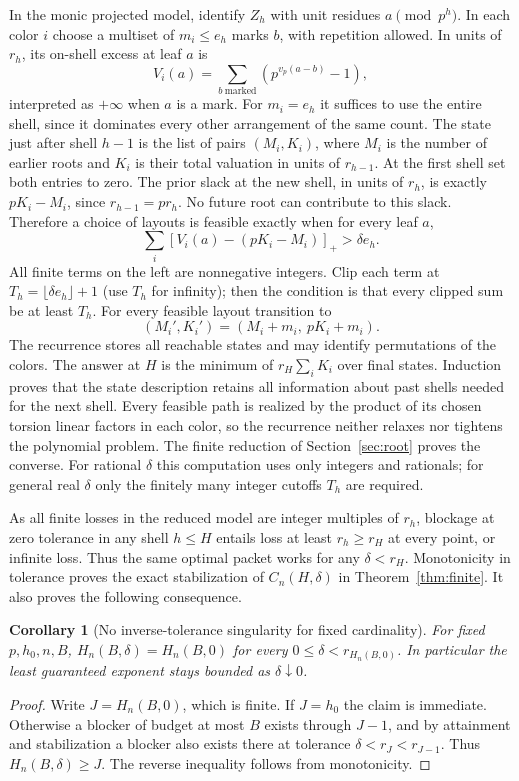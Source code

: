 \documentclass[11pt]{article}
\newtheorem{corollary}[theorem]{Corollary}
\theoremstyle{remark}\newtheorem{remark}[theorem]{Remark}
\newcommand{\pos}[1]{\left[#1\right]_+}
\begin{document}
In the monic projected model, identify $Z_h$ with unit residues $a\pmod{p^h}$. In each color $i$ choose a multiset of $m_i\le e_h$ marks $b$, with repetition allowed. In units of $r_h$, its on-shell excess at leaf $a$ is
\[
 V_i(a)=\sum_{b\ \mathrm{marked}}(p^{v_p(a-b)}-1),
\]
interpreted as $+\infty$ when $a$ is a mark. For $m_i=e_h$ it suffices to use the entire shell, since it dominates every other arrangement of the same count. The state just after shell $h-1$ is the list of pairs $(M_i,K_i)$, where $M_i$ is the number of earlier roots and $K_i$ is their total valuation in units of $r_{h-1}$. At the first shell set both entries to zero. The prior slack at the new shell, in units of $r_h$, is exactly $pK_i-M_i$, since $r_{h-1}=p r_h$. No future root can contribute to this slack. Therefore a choice of layouts is feasible exactly when for every leaf $a$,
\begin{equation}\label{eq:dpcondition}
 \sum_i\pos{V_i(a)-(pK_i-M_i)}>\delta e_h.
\end{equation}
All finite terms on the left are nonnegative integers. Clip each term at $T_h=\lfloor\delta e_h\rfloor+1$ (use $T_h$ for infinity); then the condition is that every clipped sum be at least $T_h$. For every feasible layout transition to
\[
 (M_i',K_i')=(M_i+m_i,\ pK_i+m_i).
\]
The recurrence stores all reachable states and may identify permutations of the colors. The answer at $H$ is the minimum of $r_H\sum_i K_i$ over final states. Induction proves that the state description retains all information about past shells needed for the next shell. Every feasible path is realized by the product of its chosen torsion linear factors in each color, so the recurrence neither relaxes nor tightens the polynomial problem. The finite reduction of Section~\ref{sec:root} proves the converse. For rational $\delta$ this computation uses only integers and rationals; for general real $\delta$ only the finitely many integer cutoffs $T_h$ are required.

As all finite losses in the reduced model are integer multiples of $r_h$, blockage at zero tolerance in any shell $h\le H$ entails loss at least $r_h\ge r_H$ at every point, or infinite loss. Thus the same optimal packet works for any $\delta<r_H$. Monotonicity in tolerance proves the exact stabilization of $C_n(H,\delta)$ in Theorem~\ref{thm:finite}. It also proves the following consequence.
\begin{corollary}[No inverse-tolerance singularity for fixed cardinality]
For fixed $p,h_0,n,B$, $H_n(B,\delta)=H_n(B,0)$ for every $0\le\delta<r_{H_n(B,0)}$. In particular the least guaranteed exponent stays bounded as $\delta\downarrow0$.
\end{corollary}
\begin{proof}
Write $J=H_n(B,0)$, which is finite. If $J=h_0$ the claim is immediate. Otherwise a blocker of budget at most $B$ exists through $J-1$, and by attainment and stabilization a blocker also exists there at tolerance $\delta<r_J<r_{J-1}$. Thus $H_n(B,\delta)\ge J$. The reverse inequality follows from monotonicity.
\end{proof}
\end{document}
